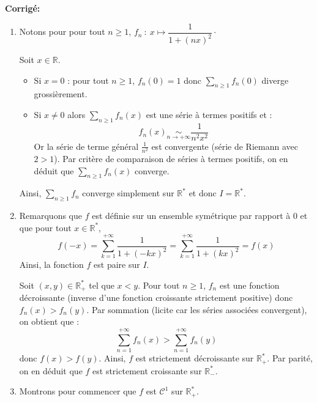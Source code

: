 \documentclass[a4paper,twoside,french,11pt]{VcCours}
\newcommand{\Sum}[2]{\sum_{#1}^{#2}}
\newcommand{\corr}{\textbf{Corrigé:}}
\begin{document}
\corr \begin{enumerate}
\item  Notons pour pour tout $n \geq 1$, $f_n\ :\ x\mapsto \dfrac{1}{1+(nx)^2} \cdot$

\medskip

Soit $x \in \mathbb{R}$.

\begin{itemize}
\item Si $x=0$ : pour tout $n \geq 1$, $f_n(0)=1$ donc $\Sum{n \geq 1}{} f_n(0)$ diverge grossièrement.
\item Si $x \neq 0$ alors $\Sum{n \geq 1}{} f_n(x)$ est une série à termes positifs et :
$$ f_n(x) \underset{n \rightarrow + \infty}{\sim} \frac{1}{n^2x^2}$$
Or la série de terme général $\frac{1}{n^2}$ est convergente (série de Riemann avec $2>1$). Par critère de comparaison de séries à termes positifs, on en déduit que $\Sum{n \geq 1}{} f_n(x)$ converge.
\end{itemize}
Ainsi, $\Sum{n \geq 1}{} f_n$ converge simplement sur $\mathbb{R}^*$ et donc $I = \mathbb{R}^*$.

\item Remarquons que $f$ est définie sur un ensemble symétrique par rapport à $0$ et que pour tout $x \in \mathbb{R}^*$,
$$ f(-x) = \sum_{k=1}^{+ \infty} \frac{1}{1+(-kx)^2} = \sum_{k=1}^{+ \infty} \frac{1}{1+(kx)^2} = f(x)$$
Ainsi, la fonction $f$ est paire sur $I$.

\medskip

Soit $(x,y) \in \mathbb{R}_+^{*}$ tel que $x<y$. Pour tout $n \geq 1$, $f_n$ est une fonction décroissante (inverse d'une fonction croissante strictement positive) donc $f_n(x)>f_n(y)$. Par sommation (licite car les séries associées convergent), on obtient que :
$$ \sum_{n=1}^{+ \infty} f_n(x) >  \sum_{n=1}^{+ \infty} f_n(y)$$
donc $f(x) > f(y)$. Ainsi, $f$ est strictement décroissante sur $\mathbb{R}_+^{*}$.
Par parité, on en déduit que $f$ est strictement croissante sur $\mathbb{R}_{-}^{*}$.
\item Montrons pour commencer que $f$ est $\mathcal{C}^1$ sur $\mathbb{R}_+^{*}$.


\end{enumerate}
\end{document}
